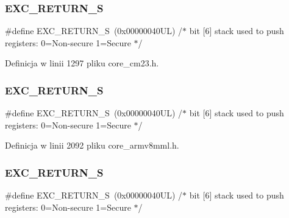 \subsubsection{\texorpdfstring{E\+X\+C\+\_\+\+R\+E\+T\+U\+R\+N\+\_\+S}{EXC\_RETURN\_S}\hspace{0.1cm}{\footnotesize\ttfamily [2/4]}}
{\footnotesize\ttfamily \#define E\+X\+C\+\_\+\+R\+E\+T\+U\+R\+N\+\_\+S~(0x00000040\+U\+L)     /$\ast$ bit \mbox{[}6\mbox{]} stack used to push registers\+: 0=\+Non-\/secure 1=\+Secure          $\ast$/}



Definicja w linii 1297 pliku core\+\_\+cm23.\+h.

\mbox{\label{group___c_m_s_i_s___core___n_v_i_c_functions_ga88711355d0196b1ffeb18c33e2c95360}} 
\subsubsection{\texorpdfstring{E\+X\+C\+\_\+\+R\+E\+T\+U\+R\+N\+\_\+S}{EXC\_RETURN\_S}\hspace{0.1cm}{\footnotesize\ttfamily [3/4]}}
{\footnotesize\ttfamily \#define E\+X\+C\+\_\+\+R\+E\+T\+U\+R\+N\+\_\+S~(0x00000040\+U\+L)     /$\ast$ bit \mbox{[}6\mbox{]} stack used to push registers\+: 0=\+Non-\/secure 1=\+Secure          $\ast$/}



Definicja w linii 2092 pliku core\+\_\+armv8mml.\+h.

\mbox{\label{group___c_m_s_i_s___core___n_v_i_c_functions_ga88711355d0196b1ffeb18c33e2c95360}} 
\subsubsection{\texorpdfstring{E\+X\+C\+\_\+\+R\+E\+T\+U\+R\+N\+\_\+S}{EXC\_RETURN\_S}\hspace{0.1cm}{\footnotesize\ttfamily [4/4]}}
{\footnotesize\ttfamily \#define E\+X\+C\+\_\+\+R\+E\+T\+U\+R\+N\+\_\+S~(0x00000040\+U\+L)     /$\ast$ bit \mbox{[}6\mbox{]} stack used to push registers\+: 0=\+Non-\/secure 1=\+Secure          $\ast$/}



